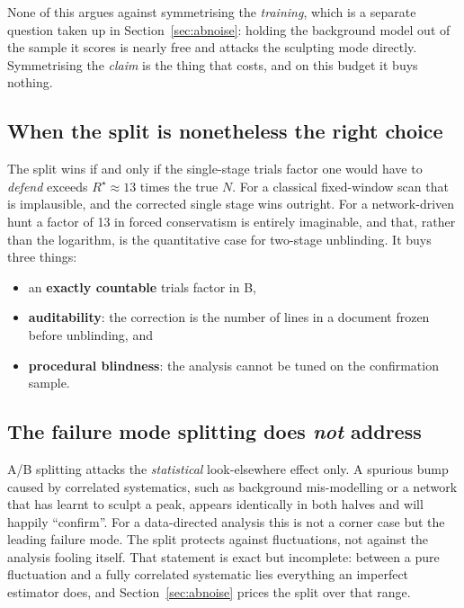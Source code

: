 None of this argues against symmetrising the \emph{training}, which is a separate question taken
up in Section~\ref{sec:abnoise}: holding the background model out of the sample it scores is nearly
free and attacks the sculpting mode directly. Symmetrising the \emph{claim} is the thing that
costs, and on this budget it buys nothing.

\subsection{When the split is nonetheless the right choice}
\label{sec:abwhy}

The split wins if and only if the single-stage trials factor one would have to \emph{defend}
exceeds $R^\star \approx 13$ times the true $N$. For a classical fixed-window scan that is
implausible, and the corrected single stage wins outright. For a network-driven hunt a factor of
13 in forced conservatism is entirely imaginable, and that, rather than the logarithm, is the
quantitative case for two-stage unblinding. It buys three things:

\begin{itemize}[leftmargin=1.4em,itemsep=2pt]
  \item an \textbf{exactly countable} trials factor in B,
  \item \textbf{auditability}: the correction is the number of lines in a document frozen before
        unblinding, and
  \item \textbf{procedural blindness}: the analysis cannot be tuned on the confirmation sample.
\end{itemize}

\subsection{The failure mode splitting does \emph{not} address}
\label{sec:abblind}

A/B splitting attacks the \emph{statistical} look-elsewhere effect only. A spurious bump caused by
correlated systematics, such as background mis-modelling or a network that has learnt to sculpt a
peak, appears identically in both halves and will happily ``confirm''. For a data-directed
analysis this is not a corner case but the leading failure mode. The split protects against
fluctuations, not against the analysis fooling itself. That statement is exact but incomplete:
between a pure fluctuation and a fully correlated systematic lies everything an imperfect
estimator does, and Section~\ref{sec:abnoise} prices the split over that range.

